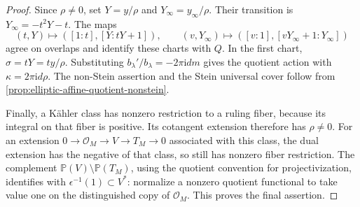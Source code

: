 \begin{proof}
Since $\rho\ne0$, set $Y=y/\rho$ and $Y_\infty=y_\infty/\rho$. Their transition is $Y_\infty=-t^2Y-t$. The maps
\[
 (t,Y)\longmapsto([1:t],[Y:tY+1]),\qquad
 (v,Y_\infty)\longmapsto([v:1],[vY_\infty+1:Y_\infty])
\]
agree on overlaps and identify these charts with $Q$. In the first chart, $\sigma=tY=ty/\rho$. Substituting $b_\lambda'/b_\lambda=-2\pi\mathrm{i}dm$ gives the quotient action with $\kappa=2\pi\mathrm{i}d\rho$. The non-Stein assertion and the Stein universal cover follow from \cref{prop:elliptic-affine-quotient-nonstein}.

Finally, a K\"ahler class has nonzero restriction to a ruling fiber, because its integral on that fiber is positive. Its cotangent extension therefore has $\rho\ne0$. For an extension $0\to\mathcal O_M\to V\to T_M\to0$ associated with this class, the dual extension has the negative of that class, so still has nonzero fiber restriction. The complement $\mathbb P(V)\setminus\mathbb P(T_M)$, using the quotient convention for projectivization, identifies with $\epsilon^{-1}(1)\subset V^*$: normalize a nonzero quotient functional to take value one on the distinguished copy of $\mathcal O_M$. This proves the final assertion.
\end{proof}
